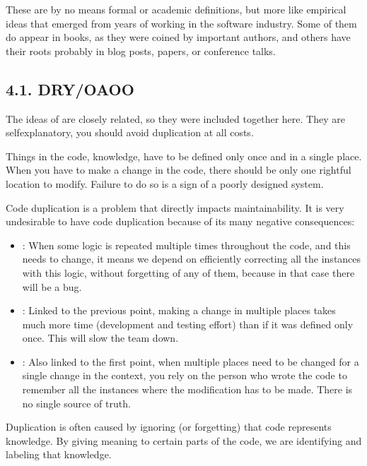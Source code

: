 \documentclass[a4paper,10pt,english]{sphinxmanual}
\begin{document}
These are by no means formal or academic definitions, but more like empirical ideas that emerged from years of
working in the software industry. Some of them do appear in books, as they were coined by important authors,
and others have their roots probably in blog posts, papers, or conference talks.


\subsection{4.1. DRY/OAOO}
\label{\detokenize{chapters/3_general_traits/index:dry-oaoo}}
The ideas of  are closely related, so they were
included together here. They are self\sphinxhyphen{}explanatory, you should avoid duplication at all costs.

Things in the code, knowledge, have to be defined only once and in a single place. When you have to make a
change in the code, there should be only one rightful location to modify. Failure to do so is a sign of a
poorly designed system.

Code duplication is a problem that directly impacts maintainability. It is very undesirable to have code
duplication because of its many negative consequences:
\begin{itemize}
\item {} 
: When some logic is repeated multiple times throughout the code, and this needs to change, it means we depend on efficiently correcting all the instances with this logic, without forgetting of any of them, because in that case there will be a bug.

\item {} 
: Linked to the previous point, making a change in multiple places takes much more time (development and testing effort) than if it was defined only once. This will slow the team down.

\item {} 
: Also linked to the first point, when multiple places need to be changed for a single change in the context, you rely on the person who wrote the code to remember all the instances where the modification has to be made. There is no single source of truth.

\end{itemize}

Duplication is often caused by ignoring (or forgetting) that code represents knowledge. By giving meaning to
certain parts of the code, we are identifying and labeling that knowledge.
\end{document}
